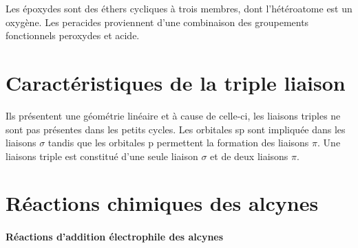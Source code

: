 Les époxydes sont des éthers cycliques à trois membres, dont l'hétéroatome est un oxygène.
Les peracides proviennent d'une combinaison des groupements fonctionnels peroxydes et acide.


\section{Caractéristiques de la triple liaison}

Ils présentent une géométrie linéaire et à cause de celle-ci, les liaisons triples ne sont pas présentes dans les petits cycles.
Les orbitales sp sont impliquée dans les liaisons $\sigma$  tandis que les orbitales p permettent la formation des liaisons $\pi$.
Une liaisons triple est constitué d'une seule liaison $\sigma$ et de deux liaisons $\pi$.


\section{Réactions chimiques des alcynes}

\paragraph{Réactions d'addition électrophile des alcynes}


